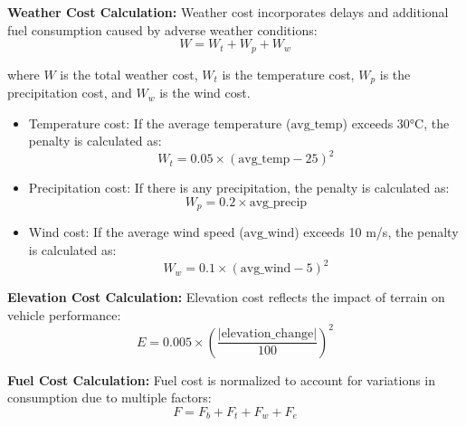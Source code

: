 \textbf{Weather Cost Calculation:}
Weather cost incorporates delays and additional fuel consumption caused by adverse weather conditions:
\begin{equation}
    W = W_t + W_p + W_w
\end{equation}

where $W$ is the total weather cost, $W_t$ is the temperature cost, $W_p$ is the precipitation cost, and $W_w$ is the wind cost.

\begin{itemize}
    \item Temperature cost: If the average temperature ($\text{avg\_temp}$) exceeds 30°C, the penalty is calculated as:
          \begin{equation}
              W_t = 0.05 \times (\text{avg\_temp} - 25)^2
          \end{equation}

    \item Precipitation cost: If there is any precipitation, the penalty is calculated as:
          \begin{equation}
              W_p = 0.2 \times \text{avg\_precip}
          \end{equation}

    \item Wind cost: If the average wind speed ($\text{avg\_wind}$) exceeds 10 m/s, the penalty is calculated as:
          \begin{equation}
              W_w = 0.1 \times (\text{avg\_wind} - 5)^2
          \end{equation}
\end{itemize}

\textbf{Elevation Cost Calculation:}
Elevation cost reflects the impact of terrain on vehicle performance:
\begin{equation}
    E = 0.005 \times \left( \frac{|\text{elevation\_change}|}{100} \right)^2
\end{equation}

\textbf{Fuel Cost Calculation:}
Fuel cost is normalized to account for variations in consumption due to multiple factors:
\begin{equation}
    F = F_b + F_t + F_w + F_e
\end{equation}

